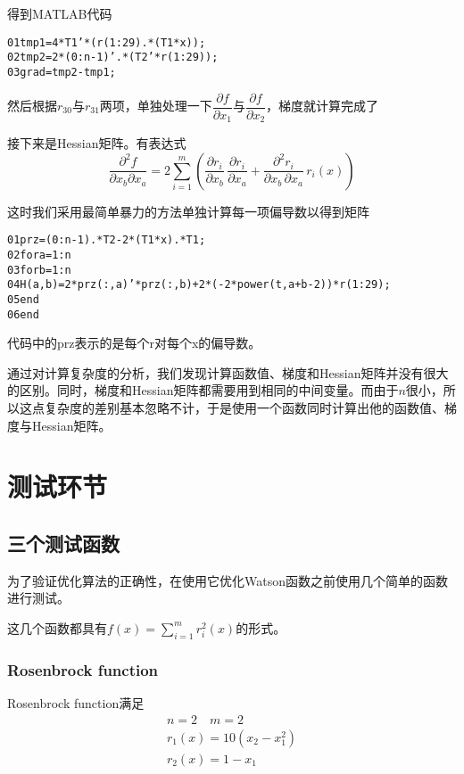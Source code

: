 \documentclass[11pt, a4paper]{article}
\begin{document}
得到MATLAB代码

\begin{framed}
\begin{alltt}
	01	tmp1 = 4 * T1' * (r(1:29) .* (T1 * x));
	02	tmp2 = 2 * (0:n-1)' .* (T2' * r(1:29));
	03	grad = tmp2 - tmp1;
\end{alltt}
\end{framed}

然后根据$r_{30}$与$r_{31}$两项，单独处理一下$\dfrac{\partial f}{\partial x_1}$与$\dfrac{\partial f}{\partial x_2}$，梯度就计算完成了

接下来是Hessian矩阵。有表达式
\[
\frac{\partial^2 f}{\partial x_b \partial x_a}=2\sum_{i=1}^{m}\left(\frac{\partial r_i}{\partial x_b}\,\frac{\partial r_i}{\partial x_a}+\frac{\partial^2r_i}{\partial x_b\,\partial x_a}\,r_i(x)\right)
\]

这时我们采用最简单暴力的方法单独计算每一项偏导数以得到矩阵

\begin{framed}
\begin{alltt}
	01 prz = (0:n-1) .* T2 - 2 * (T1 * x) .* T1;
	02 for a = 1:n
	03     for b = 1:n
	04 	       H(a, b)=2*prz(:,a)'*prz(:,b)+2*(-2*power(t,a+b-2))*r(1:29);
	05     end
	06 end
\end{alltt}
\end{framed}

代码中的prz表示的是每个r对每个x的偏导数。

通过对计算复杂度的分析，我们发现计算函数值、梯度和Hessian矩阵并没有很大的区别。同时，梯度和Hessian矩阵都需要用到相同的中间变量。而由于$n$很小，所以这点复杂度的差别基本忽略不计，于是使用一个函数同时计算出他的函数值、梯度与Hessian矩阵。

\section{测试环节}

\subsection{三个测试函数}

为了验证优化算法的正确性，在使用它优化Watson函数之前使用几个简单的函数进行测试。

这几个函数都具有\(f(x)=\sum_{i=1}^m r_i^2(x)\)的形式。

\subsubsection{Rosenbrock function}
Rosenbrock function\cite{doi:10.1093/comjnl/3.3.175}满足
\begin{equation*}
\begin{array}{c}
n=2\quad m=2\\
r_1(x)=10(x_2-x_1^2)\\
r_2(x)=1-x_1
\end{array}
\end{equation*}
\end{document}
